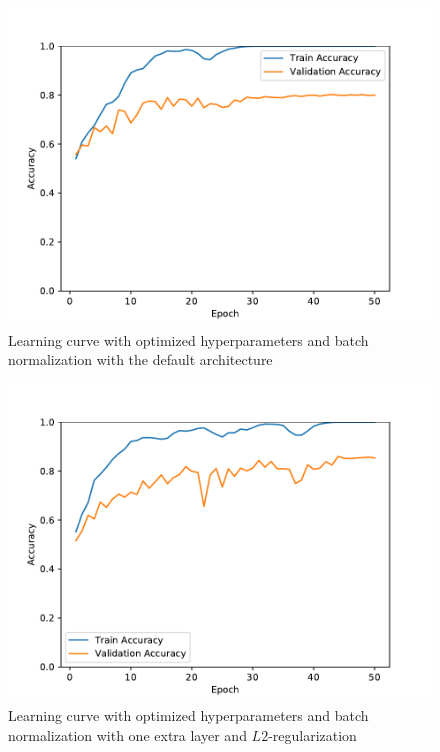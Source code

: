 \documentclass{article}
\begin{document}
\begin{figure}[h]
  \centering
  \includegraphics[width=\linewidth]{figures/default_bn.pdf}
  \caption{Learning curve with optimized hyperparameters and batch
    normalization with the default architecture}\label{fig:default}
\end{figure}

\begin{figure}[h]
  \centering
  \includegraphics[width=\linewidth]{figures/best.pdf}
  \caption{Learning curve with optimized hyperparameters and batch
    normalization with one extra layer and
    $L2$-regularization}\label{fig:best}
\end{figure}
\end{document}
